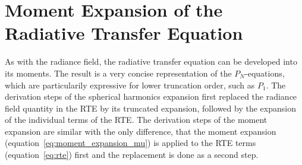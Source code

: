 \section{Moment Expansion of the Radiative Transfer Equation}
\label{sec:da_moment_expansion_RTE}


As with the radiance field, the radiative transfer equation can be developed into its moments. The result is a very concise representation of the $P_N$-equations, which are particularily expressive for lower truncation order, such as $P_1$. The derivation steps of the spherical harmonics expansion first replaced the radiance field quantity in the RTE by its truncated expansion, followed by the expansion of the individual terms of the RTE. The derivation steps of the moment expansion are similar with the only difference, that the moment expansion (equation~\ref{eq:moment_expansion_mu}) is applied to the RTE terms (equation~\ref{eq:rte}) first and the replacement is done as a second step.


